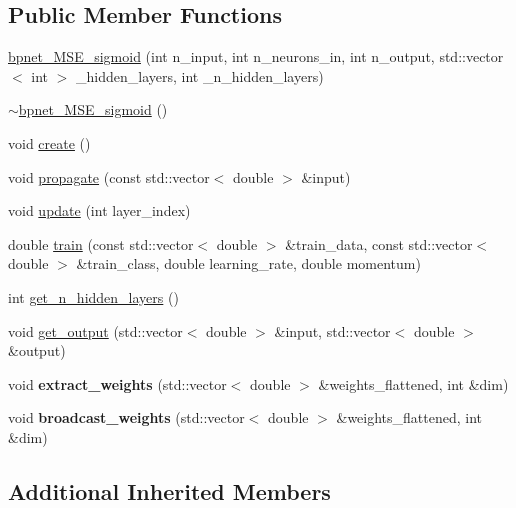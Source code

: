\subsection*{Public Member Functions}
\begin{DoxyCompactItemize}
\item 
\hyperlink{classbpnet__MSE__sigmoid_ae9db37565d0e635570178896965a9d8c}{bpnet\-\_\-\-M\-S\-E\-\_\-sigmoid} (int n\-\_\-input, int n\-\_\-neurons\-\_\-in, int n\-\_\-output, std\-::vector$<$ int $>$ \-\_\-hidden\-\_\-layers, int \-\_\-n\-\_\-hidden\-\_\-layers)
\item 
\hyperlink{classbpnet__MSE__sigmoid_ad01362c64b5a4ad692f5a7ce77ab9f3e}{$\sim$bpnet\-\_\-\-M\-S\-E\-\_\-sigmoid} ()
\item 
void \hyperlink{classbpnet__MSE__sigmoid_a1e80df296941ce0751c8106998db05ed}{create} ()
\item 
void \hyperlink{classbpnet__MSE__sigmoid_a1ddf105554e8b9471417f624d8142077}{propagate} (const std\-::vector$<$ double $>$ \&input)
\item 
void \hyperlink{classbpnet__MSE__sigmoid_a0f934ee98b63ff4d96584cea3736a6c2}{update} (int layer\-\_\-index)
\item 
double \hyperlink{classbpnet__MSE__sigmoid_a8d69e64434b2aa992744746e5b687984}{train} (const std\-::vector$<$ double $>$ \&train\-\_\-data, const std\-::vector$<$ double $>$ \&train\-\_\-class, double learning\-\_\-rate, double momentum)
\item 
int \hyperlink{classbpnet__MSE__sigmoid_a1aab79a52a004260011a68bf50eabd28}{get\-\_\-n\-\_\-hidden\-\_\-layers} ()
\item 
void \hyperlink{classbpnet__MSE__sigmoid_ab4bf4f79ba1625fd155e7de251b57609}{get\-\_\-output} (std\-::vector$<$ double $>$ \&input, std\-::vector$<$ double $>$ \&output)
\item 
\hypertarget{classbpnet__MSE__sigmoid_ab351ac8ace7a46e4fcc1dbfaa08888a3}{void {\bfseries extract\-\_\-weights} (std\-::vector$<$ double $>$ \&weights\-\_\-flattened, int \&dim)}\label{classbpnet__MSE__sigmoid_ab351ac8ace7a46e4fcc1dbfaa08888a3}

\item 
\hypertarget{classbpnet__MSE__sigmoid_a92439486b951b6d2064a89dfba9d32d6}{void {\bfseries broadcast\-\_\-weights} (std\-::vector$<$ double $>$ \&weights\-\_\-flattened, int \&dim)}\label{classbpnet__MSE__sigmoid_a92439486b951b6d2064a89dfba9d32d6}

\end{DoxyCompactItemize}
\subsection*{Additional Inherited Members}


